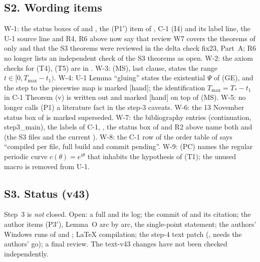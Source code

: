 \subsection*{S2. Wording items}
W-1: the status boxes of  and , the (P1$'$) item of , C-1 (I4) and its label line, the U-1 source line and R4, R6 above now say that review W7 covers the theorems of  only and that the S3 theorems were reviewed in the delta check fix23, Part~A; R6 no longer lists an independent check of the S3 theorems as open. W-2: the axiom checks for (T4), (T5) are in . W-3: (MS), last clause, states the range $t\in[0,T_{\max}-t_1)$. W-4: U-1 Lemma ``gluing'' states the existential $\Psi$ of (GE), and the step to the piecewise map is marked [hand]; the identification $T_{\max}=T_*-t_1$ in C-1 Theorem (v) is written out and marked [hand] on top of (MS). W-5:  no longer calls (P1) a literature fact in the step-3 caveats. W-6: the 13 November status box of  is marked superseded. W-7: the  bibliography entries (continuation, step3\_main), the labels of C-1, , the status box of  and R2 above name both  and  (the S3 files and the current ). W-8: the C-1 row of the order table of  says ``compiled per file, full build and commit pending''. W-9: (PC) names the regular periodic curve $c(\theta)=e^{i\theta}$ that inhabits the hypothesis of (T1); the unused macro  is removed from U-1.
\subsection*{S3. Status (v43)}
Step~3 is \emph{not} closed. Open: a full  and its log; the commit of  and its citation; the author items (P3$'$), Lemma~O arc by arc, the single-point statement; the authors' Windows runs of  and ; LaTeX compilation; the step-4 text patch (, needs the authors' go); a final review. The text-v43 changes have not been checked independently.
